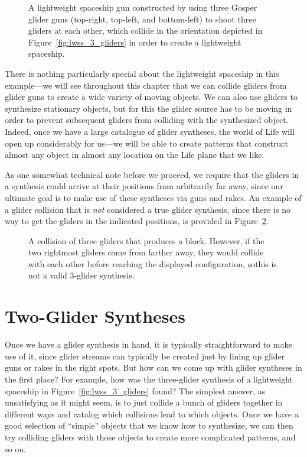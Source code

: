 \begin{figure}[!htb]
	\centering{}
	\caption{A lightweight spaceship gun constructed by using three Gosper glider guns (top-right, top-left, and bottom-left) to shoot three gliders at each other, which collide in the orientation depicted in Figure~\ref{fig:lwss_3_gliders} in order to create a lightweight spaceship.}\label{fig:lwss_gun}
\end{figure}

There is nothing particularly special about the lightweight spaceship in this example---we will see throughout this chapter that we can collide gliders from glider guns to create a wide variety of moving objects. We can also use gliders to synthesize stationary objects, but for this the glider source has to be moving in order to prevent subsequent gliders from colliding with the synthesized object. Indeed, once we have a large catalogue of glider syntheses, the world of Life will open up considerably for us---we will be able to create patterns that construct almost any object in almost any location on the Life plane that we like. 

As one somewhat technical note before we proceed, we require that the gliders in a synthesis could arrive at their positions from arbitrarily far away, since our ultimate goal is to make use of these syntheses via guns and rakes. An example of a glider collision that is \emph{not} considered a true glider synthesis, since there is no way to get the gliders in the indicated positions, is provided in Figure~\ref{fig:invalid_synthesis}.

\begin{figure}[!htb]
	\centering{}
	\caption{A collision of three gliders that produces a block. However, if the two rightmost gliders came from farther away, they would collide with each other before reaching the displayed configuration, sothis is not a valid $3$-glider synthesis.}\label{fig:invalid_synthesis}
\end{figure}


\section{Two-Glider Syntheses}\label{sec:2glidersynth}

Once we have a glider synthesis in hand, it is typically straightforward to make use of it, since glider streams can typically be created just by lining up glider guns or rakes in the right spots. But how can we come up with glider syntheses in the first place? For example, how was the three-glider synthesis of a lightweight spaceship in Figure~\ref{fig:lwss_3_gliders} found? The simplest answer, as unsatisfying as it might seem, is to just collide a bunch of gliders together in different ways and catalog which collisions lead to which objects. Once we have a good selection of ``simple'' objects that we know how to synthesize, we can then try colliding gliders with those objects to create more complicated patterns, and so on.

